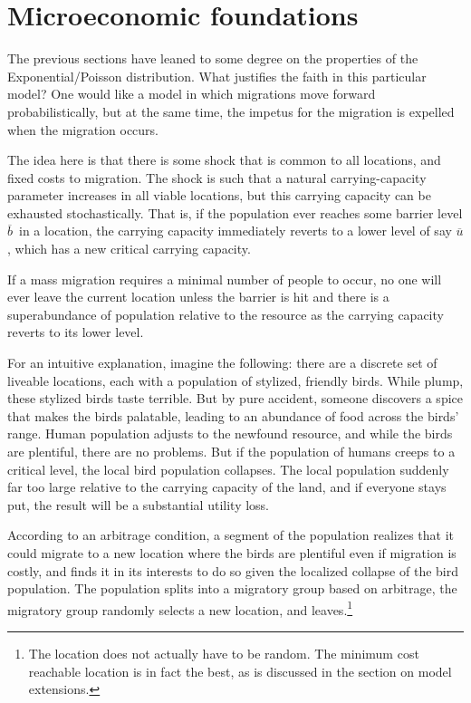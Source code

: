 \documentclass[11pt]{article}
\begin{document}
\section{Microeconomic foundations}

The previous sections have leaned to some degree on the properties of the Exponential/Poisson distribution. What  justifies the faith in this particular model? One would like a model in which migrations move forward probabilistically, but at the same time, the impetus for the migration is expelled when the migration occurs. 

The idea here is that there is some shock that is common to all locations, and fixed costs to migration. The shock is such that a natural carrying-capacity parameter increases in all viable locations, but this carrying capacity can be exhausted stochastically. That is, if the population ever reaches some barrier level $\overline{b}$\ in a location, the carrying capacity immediately reverts to a lower level of say $\overline{u}$, which has a new critical carrying capacity. 

If a mass migration requires a minimal number of people to occur, no one will ever leave the current location unless the barrier is hit and there is a superabundance of population relative to the resource as the carrying capacity reverts to its lower level.

For an intuitive explanation, imagine the following: there are a discrete set of liveable locations, each with a population of stylized, friendly birds. While plump, these stylized birds taste terrible. But by pure accident, someone discovers a spice that makes the birds palatable, leading to an abundance of food across the birds' range. Human population adjusts to the newfound resource, and while the birds are plentiful, there are no problems. But if the population of humans creeps to a critical level, the local bird population collapses. The local population suddenly far too large relative to the carrying capacity of the land, and if everyone stays put, the result will be a substantial utility loss. 

According to an arbitrage condition, a segment of the population realizes that it could migrate to a new location where the birds are plentiful even if migration is costly, and finds it in its interests to do so given the localized collapse of the bird population. The population splits into a migratory group based on arbitrage, the migratory group randomly selects a new location, and leaves.\footnote{The location does not actually have to be random. The minimum cost reachable location is in fact the best, as is discussed in the section on model extensions.}
\end{document}
